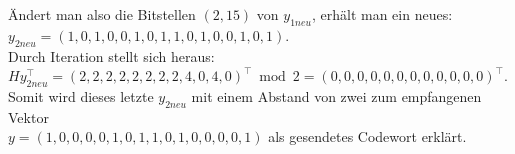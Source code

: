 \begin{Beispiel}
        Ändert man also die Bitstellen $(2, 15)$ von $y_{1neu}$, erhält man ein neues:\\
        $y_{2neu} = (1,0,1,0,0,1,0,1,1,0,1,0,0,1,0,1).$\\
        
        Durch Iteration stellt sich heraus:\\
        $Hy_{2neu}^\intercal = (2,2,2,2,2,2,2,2,4,0,4,0)^\intercal \bmod 2 =(0,0,0,0,0,0,0,0,0,0,0,0)^\intercal.$\\
        
        Somit wird dieses letzte $y_{2neu}$ mit einem Abstand von zwei 
        zum empfangenen Vektor\\
        $y = (1,0,0,0,0,1,0,1,1,0,1,0,0,0,0,1)$ als gesendetes Codewort erklärt.\\ 
        
    \end{Beispiel}
    
